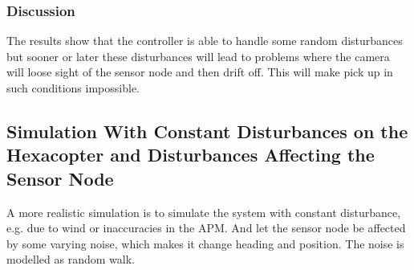 \subsubsection{Discussion}
The results show that the controller is able to handle some random disturbances but sooner or later these disturbances will lead to problems where the camera will loose sight of the sensor node and then drift off. This will make pick up in such conditions impossible.
\subsection{Simulation With Constant Disturbances on the Hexacopter and Disturbances Affecting the Sensor Node}
A more realistic simulation is to simulate the system with constant disturbance, e.g. due to wind or inaccuracies in the APM. And let the sensor node be affected by some varying noise, which makes it change heading and position. The noise is modelled as random walk.
